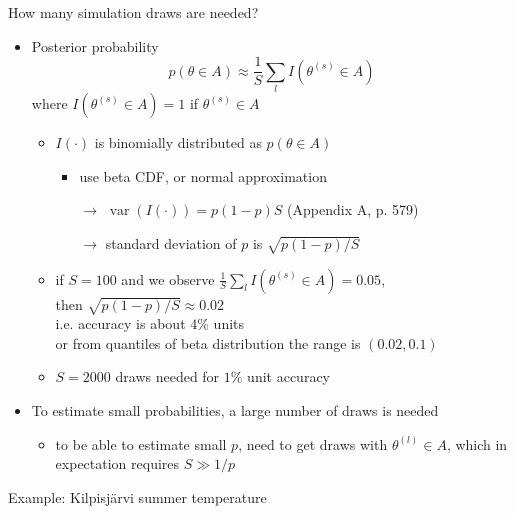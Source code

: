 \documentclass[english,t]{beamer}
\DeclareMathOperator{\var}{var}
\begin{document}
\begin{frame}{How many simulation draws are needed?}

  \begin{itemize}
  \item Posterior probability
    \begin{equation*}
      p(\theta \in A)\approx \frac{1}{S}\sum_l I(\theta^{(s)} \in A)
    \end{equation*}
    where $I(\theta^{(s)} \in A)=1$ if $\theta^{(s)} \in A$
    \begin{itemize}
    \item $I(\cdot)$ is binomially distributed as $p(\theta \in A)$
        \begin{itemize}
        \item use beta CDF, or normal approximation
        \item[$\rightarrow$] $\var(I(\cdot)) =  p(1-p)S$  (Appendix A, p. 579)
        \item[$\rightarrow$] standard deviation of $p$ is $\sqrt{p(1-p)/S}$
        \end{itemize}
        \pause
      \item if $S=100$ and we observe $\frac{1}{S}\sum_l I(\theta^{(s)} \in A)=0.05$,\\ then $\sqrt{p(1-p)/S} \approx 0.02$\\
        i.e. accuracy is about $4\%$ units\\
        or from quantiles of beta distribution the range is $(0.02,0.1)$
        \pause
      \item $S=2000$ draws needed for $1\%$ unit accuracy
    \end{itemize}
    \pause
  \item To  estimate small probabilities, a large number of draws is needed
    \begin{itemize}
    \item to be able to estimate small $p$, need to get draws with
      $\theta^{(l)} \in A$, which in expectation requires $S \gg 1/p$
    \end{itemize}
\end{itemize}

\end{frame}

\begin{frame}{Example: Kilpisjärvi summer temperature}

  \begin{center}
  \end{center}

\end{frame}
\end{document}
